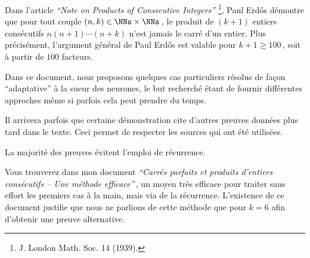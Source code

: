 Dans l'article \emph{\enquote{Note on Products of Consecutive Integers}}
\footnote{
	J. London Math. Soc. 14 (1939).
},
Paul Erdős démontre que pour tout couple $(n, k) \in \NNs \times \NNs$\,, le produit de $(k+1)$ entiers consécutifs $n (n + 1) \cdots (n + k)$ n'est jamais le carré d'un entier. 
Plus précisément, l'argument général de Paul Erdős est valable pour $k + 1 \geq 100$\,, soit à partir de $100$ facteurs.

\medskip

Dans ce document, nous proposons quelques cas particuliers résolus de façon \enquote{adaptative} à la sueur des neurones, le but recherché étant de fournir différentes approches même si parfois cela peut prendre du temps.


\begin{remark}
	Il arrivera parfois que certaine démonstration cite d'autres preuves données plus tard dans le texte. Ceci permet de respecter les sources qui ont été utilisées.
\end{remark}


\begin{remark}
	La majorité des preuves évitent l'emploi de récurrence.
\end{remark}


\begin{remark}
	Vous trouverez dans mon document \emph{\enquote{Carrés parfaits et produits d'entiers consécutifs -- Une méthode efficace}}\,, un moyen très efficace pour traiter sans effort les premiers cas à la main, mais via de la récurrence.
	L'existence de ce document justifie que nous ne parlions de cette méthode que pour $k = 6$ afin d'obtenir une preuve alternative.
\end{remark}
